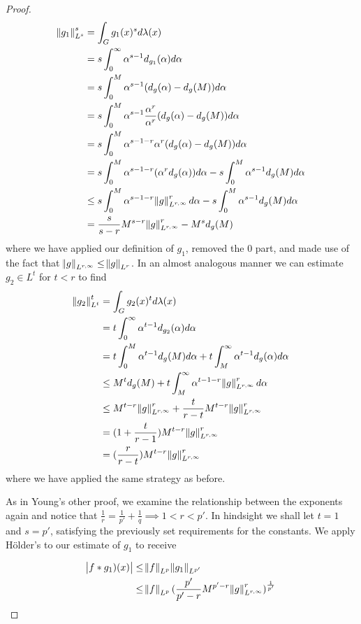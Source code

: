 \begin{proof}
\begin{align*}
\norm{g_1}_{L^s}^s &= \int_G g_1(x)^s d\lambda(x)\\
&= s \int_0^\infty \alpha^{s-1} d_{g_1}(\alpha) d\alpha \\
&= s \int_0^M \alpha^{s-1} (d_{g}(\alpha)-d_{g}(M)) d\alpha \\
&= s \int_0^M \alpha^{s-1} \frac{\alpha^r}{\alpha^r} (d_{g}(\alpha)-d_{g}(M)) d\alpha \\
&= s \int_0^M \alpha^{s-1-r} \alpha^r (d_{g}(\alpha)-d_{g}(M)) d\alpha \\
&= s \int_0^M \alpha^{s-1-r} (\alpha^r d_{g}(\alpha)) d\alpha - s \int_0^M \alpha^{s-1} d_{g}(M) d\alpha \\
&\leq s \int_0^M \alpha^{s-1-r} \norm{g}^r_{L^{r,\infty}} d\alpha - s \int_0^M \alpha^{s-1} d_{g}(M) d\alpha \\
&= \frac{s}{s-r}M^{s-r} \norm{g}^r_{L^{r,\infty}} - M^s d_g(M)
\end{align*}
where we have applied our definition of $g_1$, removed the $0$ part, and made use of the fact that $\norm{g}_{L^{r,\infty}} \leq \norm{g}_{L^{r}}$.
In an almost analogous manner we can estimate $g_2 \in L^t$ for $t < r$ to find
\begin{align*}
\norm{g_2}_{L^t}^t &= \int_G g_2(x)^t d\lambda(x)\\
&= t \int_0^\infty \alpha^{t-1} d_{g_2}(\alpha) d\alpha \\
&= t \int_0^M \alpha^{t-1} d_{g}(M) d\alpha + t \int_M^\infty \alpha^{t-1} d_{g}(\alpha) d\alpha \\
&\leq M^t d_g(M) + t \int_M^\infty \alpha^{t-1-r} \norm{g}^r_{L^{r,\infty}} d\alpha \\
&\leq M^{t-r} \norm{g}^r_{L^{r,\infty}} + \frac{t}{r-t} M^{t-r} \norm{g}^r_{L^{r,\infty}}\\
&= (1+\frac{t}{r-1}) M^{t-r} \norm{g}^r_{L^{r,\infty}} \\
&= (\frac{r}{r-t}) M^{t-r} \norm{g}^r_{L^{r,\infty}}
\end{align*} 
where we have applied the same strategy as before.

As in Young's other proof, we examine the relationship between the exponents again and notice that $\frac{1}{r} = \frac{1}{p'} + \frac{1}{q} \implies 1 < r < p'$. In hindsight we shall let $t = 1$ and $s = p'$, satisfying the previously set requirements for the constants. We apply H\"older's to our estimate of $g_1$ to receive

\begin{align*}
\abs{ f \ast g_1)(x)} &\leq \norm{f}_{L^p}\norm{g_1}_{L^{p'}} \\
&\leq \norm{f}_{L^p} (\frac{p'}{p'-r}M^{p'-r} \norm{g}^r_{L^{r,\infty}})^\frac{1}{p'}
\end{align*}


\end{proof}
